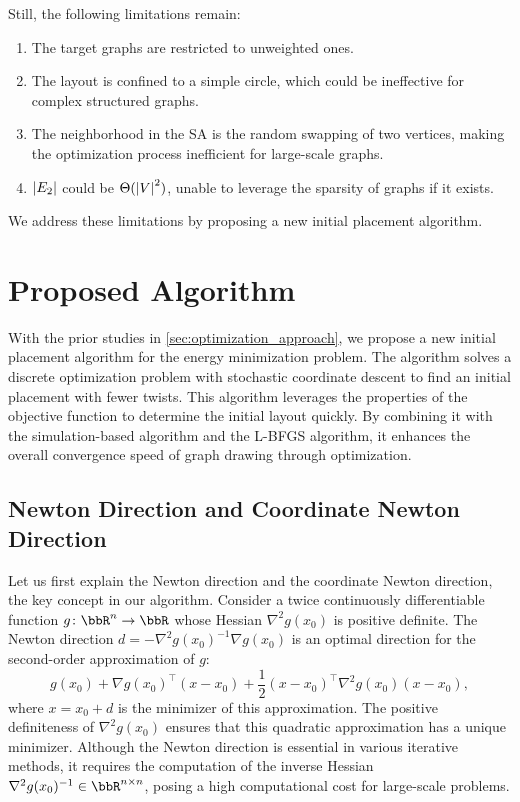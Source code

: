 \documentclass{jgaa-art}
\begin{document}
Still, the following limitations remain:
\begin{enumerate}[label=\textbullet, itemsep=0pt, parsep=0pt]
  \item The target graphs are restricted to unweighted ones.

  \item The layout is confined to a simple circle, which could be ineffective for complex structured graphs.

  \item The neighborhood in the SA is the random swapping of two vertices, making the optimization process inefficient for large-scale graphs.

  \item $\abs{E_2}$ could be $\Theta(\abs{V}^{2})$, unable to leverage the sparsity of graphs if it exists.
\end{enumerate}
We address these limitations by proposing a new initial placement algorithm.

\section{Proposed Algorithm}
\label{sec:algorithm}

With the prior studies in \cref{sec:optimization_approach}, we propose a new initial placement algorithm for the energy minimization problem.
The algorithm solves a discrete optimization problem with stochastic coordinate descent to find an initial placement with fewer twists.
This algorithm leverages the properties of the objective function to determine the initial layout quickly.
By combining it with the simulation-based algorithm and the L-BFGS algorithm, it enhances the overall convergence speed of graph drawing through optimization.

\subsection{Newton Direction and Coordinate Newton Direction}
\label{ssec:introNewton}

Let us first explain the Newton direction and the coordinate Newton direction, the key concept in our algorithm.
Consider a twice continuously differentiable function $g \colon \bbR^{n} \to \bbR$ whose Hessian $\nabla^{2}g(x_{0})$ is positive definite.
The Newton direction $d = -\nabla^{2}g(x_{0})^{-1}\nabla g(x_{0})$ is an optimal direction for the second-order approximation of $g$:
\begin{equation*}
  g(x_{0}) + \nabla g(x_{0})^{\top}(x - x_{0}) + \frac{1}{2}(x - x_{0})^{\top}\nabla
  ^{2}g(x_{0}) (x - x_{0}),
\end{equation*}
where $x = x_{0}+ d$ is the minimizer of this approximation.
The positive definiteness of $\nabla^{2}g(x_{0})$ ensures that this quadratic approximation has a unique minimizer.
Although the Newton direction is essential in various iterative methods, it requires the computation of the inverse Hessian $\nabla^{2}g(x_{0})^{-1}\in \bbR^{n \times n}$, posing a high computational cost for large-scale problems.
\end{document}
